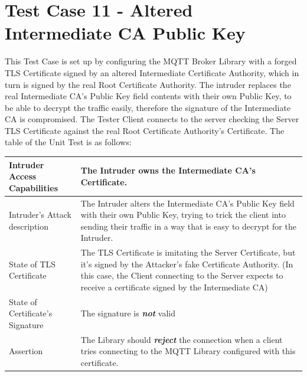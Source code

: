 \documentclass[binding=0.6cm,noexaminfo]{sapthesis}
\begin{document}
\section{Test Case 11 - Altered Intermediate CA Public Key}
This Test Case is set up by configuring the MQTT Broker Library with a forged TLS Certificate signed by an altered Intermediate Certificate Authority, which in turn is signed by the real Root Certificate Authority. The intruder replaces the real Intermediate CA’s Public Key field contents with their own Public Key, to be able to decrypt the traffic easily, therefore the signature of the Intermediate CA is compromised. The Tester Client connects to the server checking the Server TLS Certificate against the real Root Certificate Authority’s Certificate. The table of the Unit Test is as follows:

\begin{center}
\begin{tabular}{| p{6cm} | p{6cm} |}
\hline
Intruder Access Capabilities & The Intruder owns the Intermediate CA’s Certificate. \\
\hline
Intruder’s Attack description & The Intruder alters the Intermediate CA’s Public Key field with their own Public Key, trying to trick the client into sending their traffic in a way that is easy to decrypt for the Intruder. \\
\hline
State of TLS Certificate & The TLS Certificate is imitating the Server Certificate, but it’s signed by the Attacker’s fake Certificate Authority. (In this case, the Client connecting to the Server expects to receive a certificate signed by the Intermediate CA) \\
\hline
State of Certificate’s Signature & The signature is \textbf{\textit{not}} valid \\
\hline
Assertion & The Library should \textbf{\textit{reject}} the connection when a client tries connecting to the MQTT Library configured with this certificate. \\
\hline
\end{tabular}
\end{center}
\end{document}
